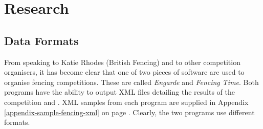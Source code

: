 \chapter{Research} \label{chapter:research}

\section{Data Formats}
From speaking to Katie Rhodes (British Fencing) and to other competition
organisers, it has become clear that one of two pieces of software are used to
organise fencing competitions. These are called \textit{Engarde} and
\textit{Fencing Time}. Both programs have the ability to output XML files
detailing the results of the competition \citep{engardewebsite} and
\citep{fencingtimewebsite}. XML samples from each program are supplied in
Appendix \ref{appendix-sample-fencing-xml} on page
\pageref{appendix-sample-fencing-xml}. Clearly, the two programs use different
formats.

